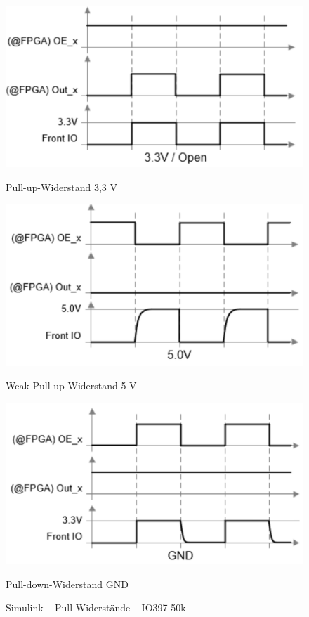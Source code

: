 \pagebreak[1]
\begin{figure}
	\begin{minipage}{0.8\textwidth}
		\centering
		\includegraphics[width=1\textwidth]{img/4_simulink/O_Interface_3V3.png}
		\caption*{Pull-up-Widerstand 3,3 V}
	\end{minipage}
	\begin{minipage}{0.8\textwidth}
		\centering
		\includegraphics[width=1\textwidth]{img/4_simulink/O_Interface_5V.png}
		\caption*{Weak Pull-up-Widerstand 5 V}
	\end{minipage}
	\begin{minipage}{0.8\textwidth}
		\centering
		\includegraphics[width=1\textwidth]{img/4_simulink/O_Interface_0V.png}
		\caption*{Pull-down-Widerstand GND}
	\end{minipage}
	\caption{Simulink – Pull-Widerstände – IO397-50k \cite[12]{speedgoat:IO397_50k}}
	\label{IO397_50k_Konfigurieren:img:Pull_Widerstande}
\end{figure}
\pagebreak[4]

